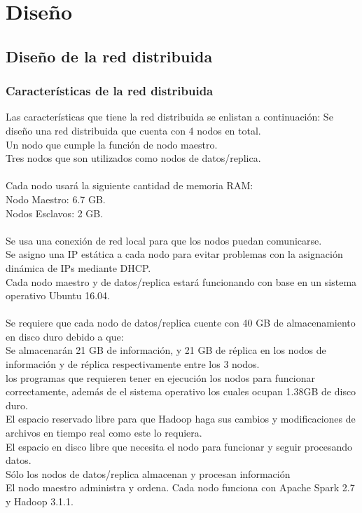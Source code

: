\section{Diseño}
\subsection{Diseño de la red distribuida}
\subsubsection{Características de la red distribuida}
Las características que tiene la red distribuida se enlistan a continuación:
Se diseño una red distribuida que cuenta con 4 nodos en total.
\\ Un nodo que cumple la función de nodo maestro.
\\ Tres nodos que son utilizados como nodos de datos/replica.
\\ \\
Cada nodo usará la siguiente cantidad de memoria RAM:
\\ Nodo Maestro: 6.7 GB.
\\ Nodos Esclavos: 2 GB.
\\ 
\\ Se usa una conexión de red local para que los nodos puedan comunicarse.
\\ Se asigno una IP estática a cada nodo para evitar problemas con la asignación dinámica de IPs mediante DHCP.
\\ Cada nodo maestro y de datos/replica estará funcionando con base en un sistema operativo Ubuntu 16.04.
\\ 
\\ Se requiere que cada nodo de datos/replica cuente con 40 GB de almacenamiento en disco duro debido a que:
\\ Se almacenarán 21 GB de información, y 21 GB de réplica en los nodos de información y de réplica respectivamente entre los 3 nodos. 
\\ los programas que requieren tener en ejecución los nodos para funcionar correctamente, además de el sistema operativo los cuales ocupan 1.38GB de disco duro.
\\ El espacio reservado libre para que Hadoop haga sus cambios y modificaciones de archivos en tiempo real como este lo requiera.
\\ El espacio en disco libre que necesita el nodo para funcionar y seguir procesando datos.
\\
Sólo los nodos de datos/replica almacenan y procesan información 
\\ El nodo maestro administra y ordena.
Cada nodo funciona con Apache Spark 2.7 y Hadoop 3.1.1.
